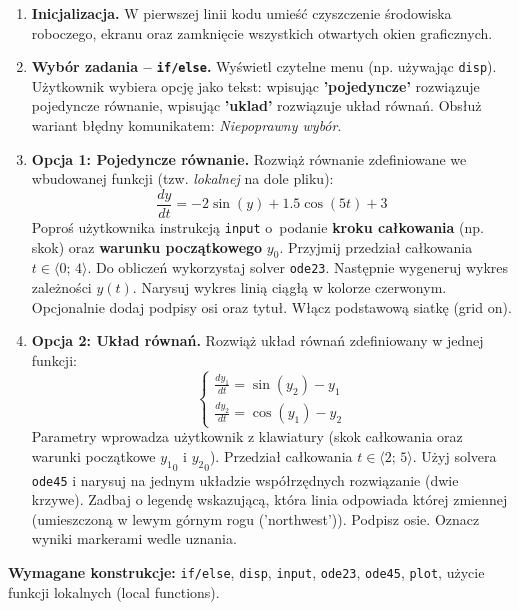 \documentclass[a4paper,11pt]{article}
\begin{document}
\begin{enumerate}[leftmargin=*, label=\textbf{\arabic*.}, itemsep=2pt]

  \item \textbf{Inicjalizacja.}
    W pierwszej linii kodu umieść czyszczenie środowiska roboczego, ekranu oraz zamknięcie wszystkich otwartych okien graficznych.

  \item \textbf{Wybór zadania -- \texttt{if/else}.}
    Wyświetl czytelne menu (np. używając \texttt{disp}). Użytkownik wybiera opcję jako tekst: wpisując \textbf{'pojedyncze'} rozwiązuje pojedyncze równanie, wpisując \textbf{'uklad'} rozwiązuje układ równań. Obsłuż wariant błędny komunikatem: \textit{Niepoprawny wybór}.

  \item \textbf{Opcja 1: Pojedyncze równanie.}
    Rozwiąż równanie zdefiniowane we wbudowanej funkcji (tzw. \textit{lokalnej} na dole pliku):
    \[ \frac{dy}{dt} = -2\sin(y) + 1.5\cos(5t) + 3 \]
    Poproś użytkownika instrukcją \texttt{input} o~podanie \textbf{kroku całkowania} (np. skok) oraz \textbf{warunku początkowego} $y_0$. Przyjmij przedział całkowania $t \in \langle 0;\,4 \rangle$.
    Do obliczeń wykorzystaj solver \texttt{ode23}. Następnie wygeneruj wykres zależności $y(t)$. Narysuj wykres linią ciągłą w kolorze czerwonym. Opcjonalnie dodaj podpisy osi oraz tytuł. Włącz podstawową siatkę (grid on).

  \item \textbf{Opcja 2: Układ równań.}
    Rozwiąż układ równań zdefiniowany w jednej funkcji:\\[-0.5em]
    \[
    \begin{cases}
      \frac{dy_1}{dt} = \sin(y_2) - y_1 \\
      \frac{dy_2}{dt} = \cos(y_1) - y_2
    \end{cases}
    \]
    Parametry wprowadza użytkownik z klawiatury (skok całkowania oraz warunki początkowe $ {y_1}_{0} $ i $ {y_2}_{0} $). Przedział całkowania $t \in \langle 2;\,5 \rangle$.
    Użyj solvera \texttt{ode45} i narysuj na jednym układzie współrzędnych rozwiązanie (dwie krzywe). Zadbaj o legendę wskazującą, która linia odpowiada której zmiennej (umieszczoną w lewym górnym rogu ('northwest')). Podpisz osie. Oznacz wyniki markerami wedle uznania.

\end{enumerate}

\vspace{0.3cm}
\begin{ramka}
\textbf{Wymagane konstrukcje:}
\texttt{if/else}, \texttt{disp}, \texttt{input}, \texttt{ode23}, \texttt{ode45}, \texttt{plot}, użycie funkcji lokalnych (local functions).
\end{ramka}
\end{document}
